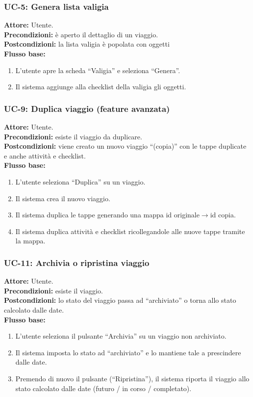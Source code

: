 \documentclass[11pt, a4paper]{article}
\begin{document}
\subsubsection*{UC-5: Genera lista valigia}
\textbf{Attore:} Utente.\\
\textbf{Precondizioni:} è aperto il dettaglio di un viaggio.\\
\textbf{Postcondizioni:} la lista valigia è popolata con oggetti \\
\textbf{Flusso base:}
\begin{enumerate}[nosep]
    \item L'utente apre la scheda ``Valigia'' e seleziona ``Genera''.
    \item Il sistema aggiunge alla checklist della valigia gli oggetti.
\end{enumerate}

\subsubsection*{UC-9: Duplica viaggio (feature avanzata)}
\textbf{Attore:} Utente.\\
\textbf{Precondizioni:} esiste il viaggio da duplicare.\\
\textbf{Postcondizioni:} viene creato un nuovo viaggio ``(copia)'' con le tappe duplicate e anche attività e checklist.\\
\textbf{Flusso base:}
\begin{enumerate}[nosep]
    \item L'utente seleziona ``Duplica'' su un viaggio.
    \item Il sistema crea il nuovo viaggio.
    \item Il sistema duplica le tappe generando una mappa id originale$\rightarrow$id copia.
    \item Il sistema duplica attività e checklist ricollegandole
    alle nuove tappe tramite la mappa.
\end{enumerate}

\subsubsection*{UC-11: Archivia o ripristina viaggio}
\textbf{Attore:} Utente.\\
\textbf{Precondizioni:} esiste il viaggio.\\
\textbf{Postcondizioni:} lo stato del viaggio passa ad ``archiviato'' o torna allo stato
calcolato dalle date.\\
\textbf{Flusso base:}
\begin{enumerate}[nosep]
    \item L'utente seleziona il pulsante ``Archivia'' su un viaggio non archiviato.
    \item Il sistema imposta lo stato ad ``archiviato'' e lo mantiene tale a prescindere
    dalle date.
    \item Premendo di nuovo il pulsante (``Ripristina''), il sistema riporta il viaggio
    allo stato calcolato dalle date (futuro / in corso / completato).
\end{enumerate}
\end{document}
